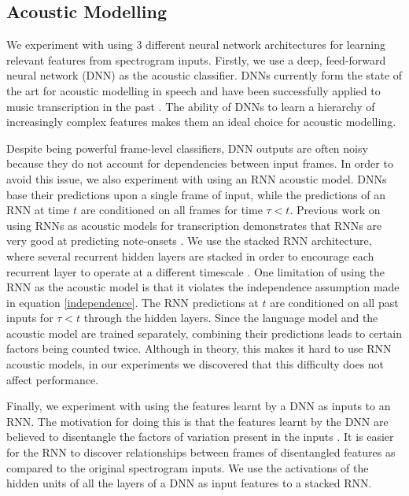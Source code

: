 \documentclass{article}
\begin{document}
\subsection{Acoustic Modelling}

We experiment with using 3 different neural network architectures for learning relevant features from spectrogram inputs. Firstly, we use a deep, feed-forward neural network (DNN) as the acoustic classifier. DNNs currently form the state of the art for acoustic modelling in speech \cite{hinton2012deep} and have been successfully applied to music transcription in the past \cite{nam2011classification,boulanger2012modeling}. The ability of DNNs to learn a hierarchy of increasingly complex features makes them an ideal choice for acoustic modelling. 

Despite being powerful frame-level classifiers, DNN outputs are often noisy because they do not account for dependencies between input frames. In order to avoid this issue, we also experiment with using an RNN acoustic model. DNNs base their predictions upon a single frame of input, while the predictions of an RNN at time $t$ are conditioned on all frames for time $\tau < t$. Previous work on using RNNs as acoustic models for transcription demonstrates that RNNs are very good at predicting note-onsets \cite{bock2012polyphonic}. We use the stacked RNN architecture, where several recurrent hidden layers are stacked in order to encourage each recurrent layer to operate at a different timescale \cite{schmidhuber1992learning}. One limitation of using the RNN as the acoustic model is that it violates the independence assumption made in equation \ref{independence}. The RNN predictions at $t$ are conditioned on all past inputs for $\tau < t$ through the hidden layers. Since the language model and the acoustic model 
are trained separately, combining their predictions leads to certain factors being counted twice. Although in theory, this makes it hard to use RNN acoustic models, in our experiments we discovered that this difficulty does not affect performance. 

Finally, we experiment with using the features learnt by a DNN as inputs to an RNN. The motivation for doing this is that the features learnt by the DNN are believed to disentangle the factors of variation present in the inputs \cite{goodfellow2009measuring}. It is easier for the RNN to discover relationships between frames of disentangled features as compared to the original spectrogram inputs. We use the activations of the hidden units of all the layers of a DNN as input features to a stacked RNN. 
\end{document}
